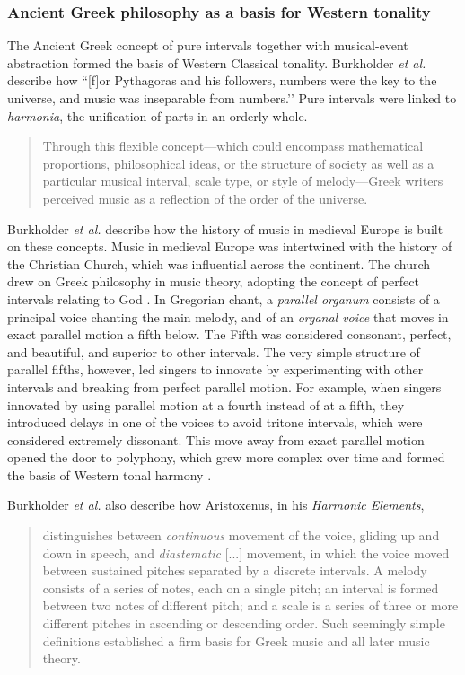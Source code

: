\subsubsection{Ancient Greek philosophy as a basis for Western tonality}
The Ancient Greek concept of pure intervals together with musical-event abstraction formed the basis of Western Classical tonality. Burkholder \textit{et al.} describe how ``[f]or Pythagoras and his followers, numbers were the key to the universe, and music was inseparable from numbers.’’ Pure intervals were linked to \textit{harmonia}, the unification of parts in an orderly whole. \begin{quotation}Through this flexible concept---which could encompass mathematical proportions, philosophical ideas, or the structure of society as well as a particular musical interval, scale type, or style of melody---Greek writers perceived music as a reflection of the order of the universe. \cite[][Ch.~1, p.~13]{burkholder2010history}\end{quotation}

Burkholder \textit{et al.} describe how the history of music in medieval Europe is built on these concepts. Music in medieval Europe was intertwined with the history of the Christian Church, which was influential across the continent. The church drew on Greek philosophy in music theory, adopting the concept of perfect intervals relating to God \cite[Ch.~2, p.~22]{burkholder2010history}. In Gregorian chant, a \textit{parallel organum} consists of a principal voice chanting the main melody, and of an \textit{organal voice} that moves in exact parallel motion a fifth below. The Fifth was considered consonant, perfect, and beautiful, and superior to other intervals. The very simple structure of parallel fifths, however, led singers to innovate by experimenting with other intervals and breaking from perfect parallel motion. For example, when singers innovated by using parallel motion at a fourth instead of at a fifth, they introduced delays in one of the voices to avoid tritone intervals, which were considered extremely dissonant. This move away from exact parallel motion opened the door to polyphony, which grew more complex over time and formed the basis of Western tonal harmony \cite[Ch.~5, p.~86]{burkholder2010history}.

Burkholder \textit{et al.} also describe how Aristoxenus, in his \textit{Harmonic Elements}, \begin{quotation}distinguishes between \textit{continuous} movement of the voice, gliding up and down in speech, and \textit{diastematic} [...] movement, in which the voice moved between sustained pitches separated by a discrete intervals. A melody consists of a series of notes, each on a single pitch; an interval is formed between two notes of different pitch; and a scale is a series of three or more different pitches in ascending or descending order. Such seemingly simple definitions established a firm basis for Greek music and all later music theory. \cite[][Ch.~1, p.~15]{burkholder2010history}\end{quotation}


